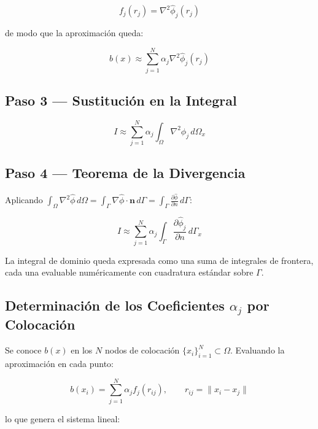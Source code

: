 \documentclass[12pt,a4paper]{article}
\begin{document}
\begin{equation}
    f_j(r_j) = \nabla^2 \hat{\phi}_j(r_j)
\end{equation}

de modo que la aproximación queda:

\begin{equation}
    b(x) \approx \sum_{j=1}^{N} \alpha_j \nabla^2 \hat{\phi}_j(r_j)
\end{equation}

\subsection{Paso 3 — Sustitución en la Integral}

\begin{equation}
    I \approx \sum_{j=1}^{N} \alpha_j \int_\Omega \nabla^2 \hat{\phi}_j\, d\Omega_x
\end{equation}

\subsection{Paso 4 — Teorema de la Divergencia}

Aplicando $\displaystyle\int_\Omega \nabla^2 \hat{\phi}\, d\Omega =
\int_\Gamma \nabla\hat{\phi} \cdot \mathbf{n}\, d\Gamma =
\int_\Gamma \frac{\partial \hat{\phi}}{\partial n}\, d\Gamma$:

\begin{equation}
\boxed{
    I \approx \sum_{j=1}^{N} \alpha_j \int_\Gamma
    \frac{\partial \hat{\phi}_j}{\partial n}\, d\Gamma_x
}
\end{equation}

La integral de dominio queda expresada como una suma de integrales de frontera,
cada una evaluable numéricamente con cuadratura estándar sobre $\Gamma$.

\subsection{Determinación de los Coeficientes $\alpha_j$ por Colocación}

Se conoce $b(x)$ en los $N$ nodos de colocación $\{x_i\}_{i=1}^N \subset
\Omega$. Evaluando la aproximación en cada punto:

\begin{equation}
    b(x_i) = \sum_{j=1}^{N} \alpha_j f_j(r_{ij}), \qquad
    r_{ij} = \|x_i - x_j\|
\end{equation}

lo que genera el sistema lineal:
\end{document}
